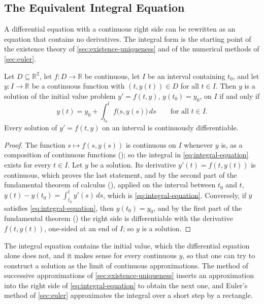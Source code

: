 \subsection{The Equivalent Integral Equation}

A differential equation with a continuous right side can be rewritten as an equation that contains no derivatives. The integral form is the starting point of the existence theory of \cref{sec:existence-uniqueness} and of the numerical methods of \cref{sec:euler}.

\begin{proposition}
\label{prop:integral-equation}
Let $D\subseteq\mathbb R^2$, let $f\colon D\to\mathbb R$ be continuous, let $I$ be an interval containing $t_0$, and let $y\colon I\to\mathbb R$ be a continuous function with $(t,y(t))\in D$ for all $t\in I$. Then $y$ is a solution of the initial value problem $y'=f(t,y)$, $y(t_0)=y_0$, on $I$ if and only if
\begin{equation}
y(t)=y_0+\int_{t_0}^tf\bigl(s,y(s)\bigr)\,ds\qquad\text{for all }t\in I .
\label{eq:integral-equation}
\end{equation}
Every solution of $y'=f(t,y)$ on an interval is continuously differentiable.
\end{proposition}

\begin{proof}
The function $s\mapsto f(s,y(s))$ is continuous on $I$ whenever $y$ is, as a composition of continuous functions (); so the integral in \eqref{eq:integral-equation} exists for every $t\in I$. Let $y$ be a solution. Its derivative $y'(t)=f(t,y(t))$ is continuous, which proves the last statement, and by the second part of the fundamental theorem of calculus (), applied on the interval between $t_0$ and $t$, $y(t)-y(t_0)=\int_{t_0}^ty'(s)\,ds$, which is \eqref{eq:integral-equation}. Conversely, if $y$ satisfies \eqref{eq:integral-equation}, then $y(t_0)=y_0$, and by the first part of the fundamental theorem () the right side is differentiable with the derivative $f(t,y(t))$, one-sided at an end of $I$; so $y$ is a solution.
\end{proof}

The integral equation contains the initial value, which the differential equation alone does not, and it makes sense for every continuous $y$, so that one can try to construct a solution as the limit of continuous approximations. The method of successive approximations of \cref{sec:existence-uniqueness} inserts an approximation into the right side of \eqref{eq:integral-equation} to obtain the next one, and Euler's method of \cref{sec:euler} approximates the integral over a short step by a rectangle.

